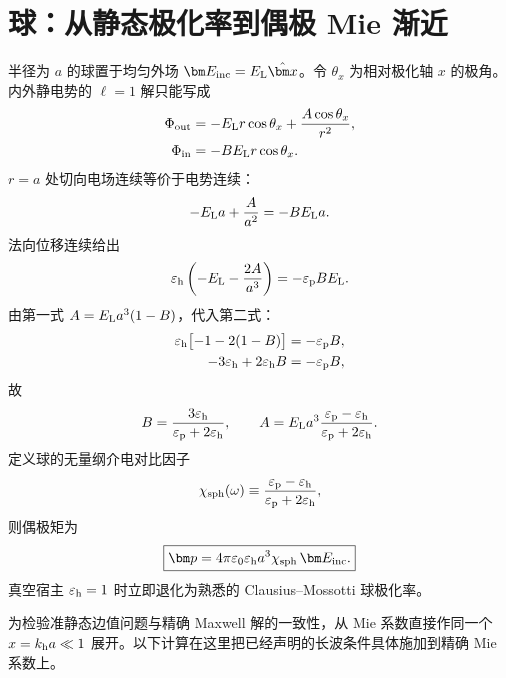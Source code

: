 \section{球：从静态极化率到偶极 Mie 渐近}
半径为 $a$ 的球置于均匀外场 $\bm E_{\rm inc}=E_{\rm L}\hat{\bm x}$。令 $\theta_x$ 为相对极化轴 $x$ 的极角。内外静电势的 $\ell=1$ 解只能写成
\begin{align}
\Phi_{\rm out}
&=-E_{\rm L}r\cos\theta_x+\frac{A\cos\theta_x}{r^2},\\
\Phi_{\rm in}
&=-B E_{\rm L}r\cos\theta_x.
\end{align}
$r=a$ 处切向电场连续等价于电势连续：
\begin{equation}
-E_{\rm L}a+\frac{A}{a^2}=-BE_{\rm L}a.
\label{eq:sphere-bc-general-1}
\end{equation}
法向位移连续给出
\begin{equation}
\varepsilon_{\rm h}
\left(-E_{\rm L}-\frac{2A}{a^3}\right)
=-\varepsilon_{\rm p}BE_{\rm L}.
\label{eq:sphere-bc-general-2}
\end{equation}
由第一式
\(
A=E_{\rm L}a^3(1-B)
\)，代入第二式：
\begin{align}
\varepsilon_{\rm h}\bigl[-1-2(1-B)\bigr]
&=-\varepsilon_{\rm p}B,\\
-3\varepsilon_{\rm h}+2\varepsilon_{\rm h}B
&=-\varepsilon_{\rm p}B,
\end{align}
故
\begin{equation}
B=\frac{3\varepsilon_{\rm h}}{\varepsilon_{\rm p}+2\varepsilon_{\rm h}},
\qquad
A=E_{\rm L}a^3
\frac{\varepsilon_{\rm p}-\varepsilon_{\rm h}}
{\varepsilon_{\rm p}+2\varepsilon_{\rm h}}.
\end{equation}
定义球的无量纲介电对比因子
\begin{equation}
\chi_{\rm sph}(\omega)
\equiv
\frac{\varepsilon_{\rm p}-\varepsilon_{\rm h}}
{\varepsilon_{\rm p}+2\varepsilon_{\rm h}},
\label{eq:chi-sphere-general}
\end{equation}
则偶极矩为
\begin{equation}
\boxed{
\bm p
=4\pi\varepsilon_0\varepsilon_{\rm h}a^3
\chi_{\rm sph}\,\bm E_{\rm inc}.}
\label{eq:sphere-polarizability-general}
\end{equation}
真空宿主 $\varepsilon_{\rm h}=1$ 时立即退化为熟悉的 Clausius--Mossotti 球极化率。

为检验准静态边值问题与精确 Maxwell 解的一致性，从 Mie 系数直接作同一个 $x=k_{\rm h}a\ll1$ 展开。以下计算在这里把已经声明的长波条件具体施加到精确 Mie 系数上。

